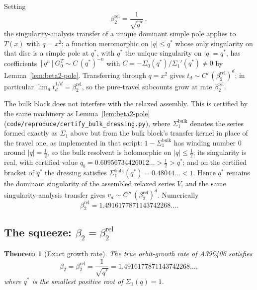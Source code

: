 \documentclass[11pt]{article}
\theoremstyle{plain}
\newtheorem{theorem}{Theorem}
\theoremstyle{definition}
\theoremstyle{remark}
\begin{document}
Setting
\[
  \beta_2^{\mathrm{rel}}=\frac{1}{\sqrt{q^\ast}}\,,
\]
the singularity-analysis transfer of a unique dominant simple pole
\cite[Thm.~VI.4]{FlajoletSedgewick} applies to $T(x)$ with $q=x^2$: a function
meromorphic on $|q|\le q^\ast$ whose only singularity on that disc is a simple
pole at $q^\ast$, with $q^\ast$ the unique singularity on $|q|=q^\ast$, has
coefficients $[q^n]G^{T}_0\sim C\,(q^\ast)^{-n}$ with
$C=-\Sigma_0(q^\ast)/\Sigma_1'(q^\ast)\ne0$ by Lemma~\ref{lem:beta2-pole}.
Transferring through $q=x^2$ gives $t_d\sim C'\,(\beta_2^{\mathrm{rel}})^{d}$;
in particular $\lim_d t_d^{1/d}=\beta_2^{\mathrm{rel}}$, so the pure-travel
subcounts grow at rate $\beta_2^{\mathrm{rel}}$.

The bulk block does not interfere with the relaxed assembly. This is
certified by the same machinery as Lemma~\ref{lem:beta2-pole}
(\texttt{code/reproduce/certify\_bulk\_dressing.py}), where
$\Sigma_1^{\mathrm{bulk}}$ denotes the series formed exactly as $\Sigma_1$ above
but from the bulk block's transfer kernel in place of the travel one, as
implemented in that script: $1-\Sigma_1^{\mathrm{bulk}}$
has winding number $0$ around $|q|=\tfrac12$, so the bulk resolvent is
holomorphic on $|q|\le\tfrac12$; its singularity is real, with certified
value $q_b=0.60956734426012\ldots>\tfrac12>q^\ast$; and on the certified
bracket of $q^\ast$ the dressing satisfies
$\Sigma_1^{\mathrm{bulk}}(q^\ast)=0.48044\ldots<1$. Hence
$q^\ast$ remains the dominant singularity of the assembled relaxed series $V$,
and the same singularity-analysis transfer gives
$v_d\sim C''\,(\beta_2^{\mathrm{rel}})^{d}$. Numerically
\[
  \beta_2^{\mathrm{rel}}=1.4916177871143742268\ldots .
\]

\subsection{The squeeze: \texorpdfstring{$\beta_2=\beta_2^{\mathrm{rel}}$}{beta2=beta2rel}}

\begin{theorem}[Exact growth rate]\label{thm:beta2}
The true orbit-growth rate of A396406 satisfies
\[
  \beta_2=\beta_2^{\mathrm{rel}}=\frac{1}{\sqrt{q^\ast}}
   =1.4916177871143742268\ldots,
\]
where $q^\ast$ is the smallest positive root of $\Sigma_1(q)=1$.
\end{theorem}
\end{document}
